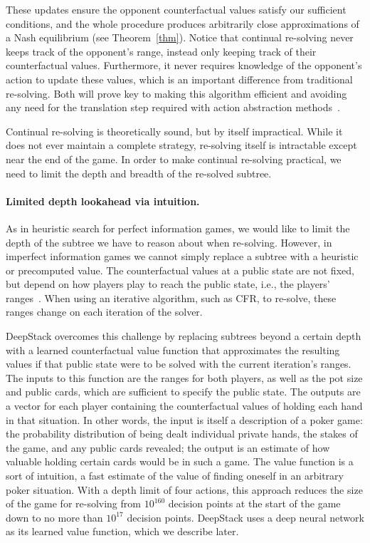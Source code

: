 \documentclass[12pt]{article}
\begin{document}
These updates ensure the opponent counterfactual values satisfy our sufficient conditions, and the whole procedure produces arbitrarily close approximations of a Nash equilibrium (see Theorem~\ref{thm}).
Notice that continual re-solving never keeps track of the opponent's range, instead only keeping track of their counterfactual values.  Furthermore, it never requires knowledge of the opponent's action to update these values, which is an important difference from traditional re-solving.  Both will prove key to making this algorithm efficient and avoiding any need for the translation step required with action abstraction methods~\cite{Gilpin08:Tartanian,Schnizlein09:Translation}.

Continual re-solving is theoretically sound, but by itself impractical.  
While it does not ever maintain a complete strategy, re-solving itself is
intractable except near the end of the game. 
In order to make continual re-solving practical, we need to limit the depth and breadth of the re-solved subtree.

\paragraph*{Limited depth lookahead via intuition.} 
As in heuristic search for perfect information games, we would like to limit the depth of the subtree we have to reason about when re-solving.  However, in imperfect information games we cannot simply replace a subtree with a heuristic or precomputed value.  The counterfactual values at a public state are not fixed, but depend on how players play to reach the public state, i.e., the players' ranges~\cite{cprg:cfrd}.  When using an iterative algorithm, such as CFR, to re-solve, these ranges change on each iteration of the solver.  

DeepStack overcomes this challenge by replacing subtrees beyond a certain depth with a learned counterfactual value function that approximates the resulting values if that public state were to be solved with the current iteration's ranges.  The inputs to this function are the ranges for both players, as well as the pot size and public cards, which are sufficient to specify the public state.  The outputs are a vector for each player containing the counterfactual values of holding each hand in that situation.  In other words, the input is itself a description of a poker game: the probability distribution of being dealt individual private hands, the stakes of the game, and any public cards revealed; the output is an estimate of how valuable holding certain cards would be in such a game.  The value function is a sort of intuition, a fast estimate of the value of finding oneself in an arbitrary poker situation.  With a depth limit of four actions, this approach reduces the size of the game for re-solving from $10^{160}$ decision points at the start of the game down to no more than $10^{17}$ decision points.  DeepStack uses a deep neural network as its learned value function, which we describe later.
\end{document}

